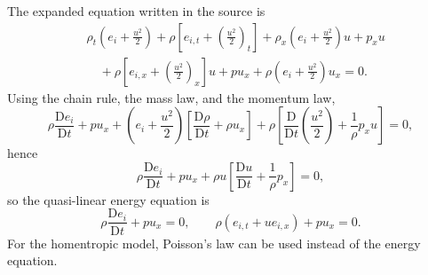 \documentclass[11pt]{article}
\begin{document}
The expanded equation written in the source is
\[
\begin{aligned}
&\rho_t\left(e_i+\frac{u^2}{2}\right)
+\rho\left[e_{i,t}+\left(\frac{u^2}{2}\right)_t\right]
+\rho_x\left(e_i+\frac{u^2}{2}\right)u+p_xu\\
&\quad+\rho\left[e_{i,x}+\left(\frac{u^2}{2}\right)_x\right]u+p u_x
+\rho\left(e_i+\frac{u^2}{2}\right)u_x=0.
\end{aligned}
\]
Using the chain rule, the mass law, and the momentum law,
\[
\rho\frac{\mathrm{D}e_i}{\mathrm{D}t}+p u_x
+\left(e_i+\frac{u^2}{2}\right)
\left[\frac{\mathrm{D}\rho}{\mathrm{D}t}+\rho u_x\right]
+\rho\left[\frac{\mathrm{D}}{\mathrm{D}t}\left(\frac{u^2}{2}\right)
+\frac{1}{\rho}p_xu\right]=0,
\]
hence
\[
\rho\frac{\mathrm{D}e_i}{\mathrm{D}t}
+p u_x
+\rho u\left[\frac{\mathrm{D}u}{\mathrm{D}t}
+\frac{1}{\rho}p_x\right]=0,
\]
so the quasi-linear energy equation is
\[
\rho\frac{\mathrm{D}e_i}{\mathrm{D}t}+p u_x=0,
\qquad
\rho(e_{i,t}+u e_{i,x})+p u_x=0.
\]
For the homentropic model, Poisson's law can be used instead of the energy
equation.

\end{document}
